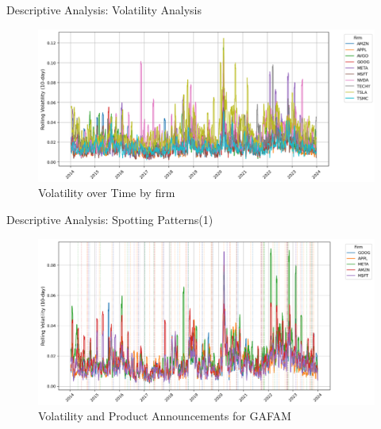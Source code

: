 \documentclass{beamer}
\begin{document}
\begin{frame}{Descriptive Analysis: Volatility Analysis}
  
\begin{figure}
    \centering
    \includegraphics[width=0.9\linewidth]{../images/volatility_analysis.png}
    \caption{Volatility over Time by firm}
    \label{fig:volatility_analysis}
\end{figure}
    
\end{frame}

\begin{frame}{Descriptive Analysis: Spotting Patterns(1)}
  
\begin{figure}
    \centering
    \includegraphics[width=0.9\linewidth]{../images/GAFAM_pattern.png}
    \caption{Volatility and Product Announcements for GAFAM}
    \label{fig:GAFAM_pattern}
\end{figure}
    
\end{frame}
\end{document}
